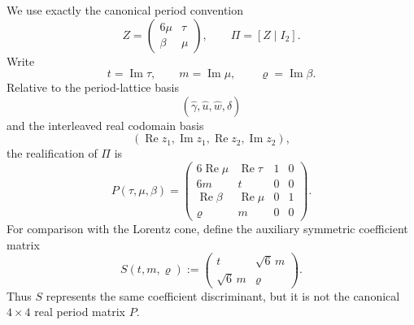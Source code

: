We use exactly the canonical period convention
\begin{equation}
 Z=\begin{pmatrix}6\mu&\tau\\ \beta&\mu\end{pmatrix},
 \qquad \Pi=[Z\mid I_2].
 \label{koide-s6-eq-canonical-complex-period}
\end{equation}
Write
\[
 t=\operatorname{Im}\tau,\qquad
 m=\operatorname{Im}\mu,\qquad
 \varrho=\operatorname{Im}\beta.
\]
Relative to the period-lattice basis
\[
 (\widehat\gamma,\widehat u,\widehat w,\widehat\delta)
\]
and the interleaved real codomain basis
\[
 (\operatorname{Re}z_1,\operatorname{Im}z_1,
  \operatorname{Re}z_2,\operatorname{Im}z_2),
\]
the realification of \(\Pi\) is
\begin{equation}
 P(\tau,\mu,\beta)=
 \begin{pmatrix}
  6\operatorname{Re}\mu&\operatorname{Re}\tau&1&0\\
  6m&t&0&0\\
  \operatorname{Re}\beta&\operatorname{Re}\mu&0&1\\
  \varrho&m&0&0
 \end{pmatrix}.
 \label{koide-s6-eq-canonical-real-period}
\end{equation}
For comparison with the Lorentz cone, define the auxiliary symmetric
coefficient matrix
\begin{equation}
 S(t,m,\varrho):=
 \begin{pmatrix}t&\sqrt6\,m\\ \sqrt6\,m&\varrho\end{pmatrix}.
 \label{koide-s6-eq-symmetric-coefficient-matrix}
\end{equation}
Thus \(S\) represents the same coefficient discriminant, but it is not the
canonical \(4\times4\) real period matrix \(P\).

